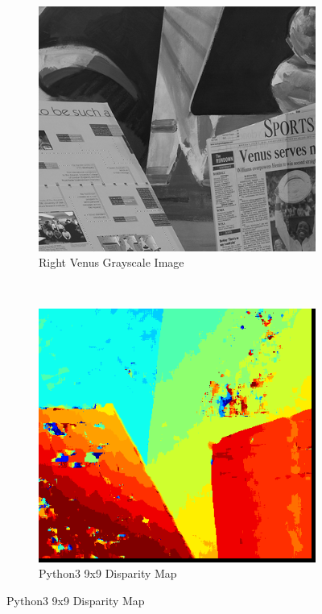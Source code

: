\begin{figure}
\begin{center}
\begin{subfigure}{0.45\textwidth}
		\includegraphics[width=\textwidth]{figures/venusR.png}
		\caption{Right Venus Grayscale Image}
		\label{fig:venusR}
	\end{subfigure}
	\\
	\begin{subfigure}{0.45\textwidth}
		\includegraphics[width=\textwidth]{figures/venus_9x9_python3.png}
		\caption{Python3 9x9 Disparity Map}
		\label{fig:venusPy}

\end{subfigure}
\end{center}
\end{figure}
